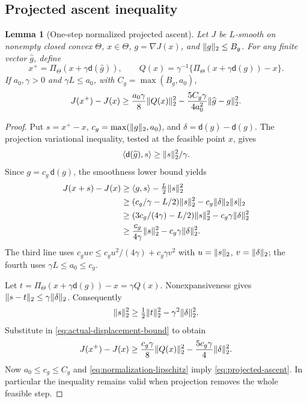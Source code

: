 \documentclass[11pt]{article}
\newtheorem{lemma}[theorem]{Lemma}
\newcommand{\1}{\mathbf 1}
\DeclarePairedDelimiter{\norm}{\lVert}{\rVert}
\DeclarePairedDelimiter{\ip}{\langle}{\rangle}
\begin{document}
\subsection{Projected ascent inequality}
\begin{lemma}[One-step normalized projected ascent]\label{lem:projected-ascent}
Let $J$ be $L$-smooth on nonempty closed convex $\Theta$, $x\in\Theta$, $g=\nabla J(x)$, and $\norm g_2\le B_g$. For any finite vector $\widehat g$, define
\[
 x^+=\Pi_\Theta(x+\gamma \mathsf d(\widehat g)),\qquad
 Q(x)=\gamma^{-1}\{\Pi_\Theta(x+\gamma \mathsf d(g))-x\}.
\]
If $a_0,\gamma>0$ and $\gamma L\le a_0$, with $C_g=\max(B_g,a_0)$,
\begin{equation}\label{eq:projected-ascent}
 J(x^+)-J(x)
 \ge\frac{a_0\gamma}{8}\norm{Q(x)}_2^2
 -\frac{5C_g\gamma}{4a_0^2}\norm{\widehat g-g}_2^2.
\end{equation}
\end{lemma}
\begin{proof}
Put $s=x^+-x$, $c_g=\max(\norm g_2,a_0)$, and $\delta=\mathsf d(\widehat g)-\mathsf d(g)$. The projection variational inequality, tested at the feasible point $x$, gives
\[
 \ip{\mathsf d(\widehat g),s}\ge\norm s_2^2/\gamma.
\]
Since $g=c_g\,\mathsf d(g)$, the smoothness lower bound yields
\begin{align}
 J(x+s)-J(x)
 &\ge\ip{g,s}-\tfrac L2\norm s_2^2\notag\\
 &\ge(c_g/\gamma-L/2)\norm s_2^2-c_g\norm\delta_2\norm s_2\notag\\
 &\ge(3c_g/(4\gamma)-L/2)\norm s_2^2-c_g\gamma\norm\delta_2^2\notag\\
 &\ge\frac{c_g}{4\gamma}\norm s_2^2-c_g\gamma\norm\delta_2^2.
 \label{eq:actual-displacement-bound}
\end{align}
The third line uses $c_g u v\le c_g u^2/(4\gamma)+c_g\gamma v^2$ with $u=\norm s_2$, $v=\norm\delta_2$; the fourth uses $\gamma L\le a_0\le c_g$.

Let $t=\Pi_\Theta(x+\gamma \mathsf d(g))-x=\gamma Q(x)$. Nonexpansiveness gives $\norm{s-t}_2\le\gamma\norm\delta_2$. Consequently
\[
 \norm s_2^2\ge\tfrac12\norm t_2^2-\gamma^2\norm\delta_2^2.
\]
Substitute in \eqref{eq:actual-displacement-bound} to obtain
\[
 J(x^+)-J(x)\ge\frac{c_g\gamma}{8}\norm{Q(x)}_2^2
 -\frac{5c_g\gamma}{4}\norm\delta_2^2.
\]
Now $a_0\le c_g\le C_g$ and \eqref{eq:normalization-lipschitz} imply \eqref{eq:projected-ascent}. In particular the inequality remains valid when projection removes the whole feasible step.
\end{proof}
\end{document}
